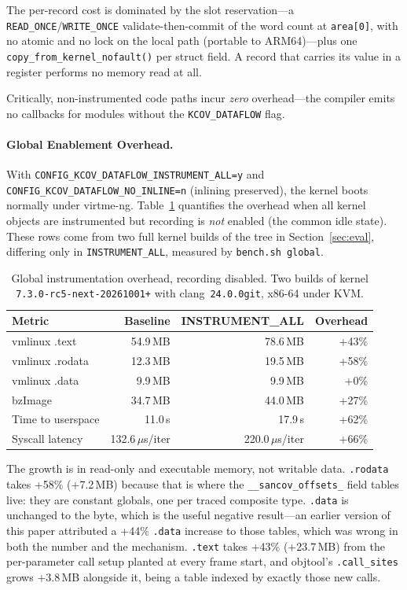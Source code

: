 \documentclass{article}
\begin{document}
The per-record cost is dominated by the slot reservation---a
\texttt{READ\_ONCE}/\texttt{WRITE\_ONCE} validate-then-commit of the word count
at \texttt{area[0]}, with no atomic and no lock on the local path (portable to
ARM64)---plus one \texttt{copy\_from\_kernel\_nofault()} per struct field. A
record that carries its value in a register performs no memory read at all.

Critically, non-instrumented code paths incur \emph{zero} overhead---the
compiler emits no callbacks for modules without the
\texttt{KCOV\_DATAFLOW} flag.

\paragraph{Global Enablement Overhead.}
With \texttt{CONFIG\_KCOV\_DATAFLOW\_INSTRUMENT\_ALL=y} and
\texttt{CONFIG\_KCOV\_DATAFLOW\_NO\_INLINE=n} (inlining preserved), the kernel
boots normally under virtme-ng. Table~\ref{tab:global-perf} quantifies the
overhead when all kernel objects are instrumented but recording is
\emph{not} enabled (the common idle state). These rows come from two full
kernel builds of the tree in Section~\ref{sec:eval}, differing only in
\texttt{INSTRUMENT\_ALL}, measured by \texttt{bench.sh global}.

\begin{table}[htbp]
\centering
\caption{Global instrumentation overhead, recording disabled. Two builds of
kernel \texttt{7.3.0-rc5-next-20261001+} with clang~\texttt{24.0.0git},
x86-64 under KVM.}\label{tab:global-perf}
\small
\begin{tabular}{@{}lrrr@{}}
\toprule
\textbf{Metric} & \textbf{Baseline} & \textbf{INSTRUMENT\_ALL} & \textbf{Overhead} \\
\midrule
vmlinux .text        & 54.9\,MB & 78.6\,MB & +43\% \\
vmlinux .rodata      & 12.3\,MB & 19.5\,MB & +58\% \\
vmlinux .data        & 9.9\,MB  & 9.9\,MB  & +0\% \\
bzImage              & 34.7\,MB & 44.0\,MB & +27\% \\
Time to userspace    & 11.0\,s  & 17.9\,s  & +62\% \\
Syscall latency      & 132.6\,$\mu$s/iter & 220.0\,$\mu$s/iter & +66\% \\
\bottomrule
\end{tabular}
\end{table}

The growth is in read-only and executable memory, not writable data.
\texttt{.rodata} takes +58\% (+7.2\,MB) because that is where the
\texttt{\_\_sancov\_offsets\_} field tables live: they are constant globals,
one per traced composite type. \texttt{.data} is unchanged to the byte, which
is the useful negative result---an earlier version of this paper attributed a
+44\% \texttt{.data} increase to those tables, which was wrong in both the
number and the mechanism. \texttt{.text} takes +43\% (+23.7\,MB) from the
per-parameter call setup planted at every frame start, and objtool's
\texttt{.call\_sites} grows +3.8\,MB alongside it, being a table indexed by
exactly those new calls.
\end{document}
